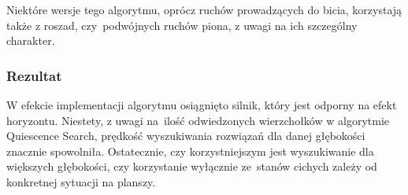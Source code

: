 Niektóre wersje tego algorytmu, oprócz ruchów prowadzących do bicia, korzystają także z roszad, czy~podwójnych ruchów piona, z uwagi na ich szczególny charakter.

\subsubsection{Rezultat}

W efekcie implementacji algorytmu osiągnięto silnik, który jest odporny na efekt horyzontu.
Niestety, z uwagi na~ilość odwiedzonych wierzchołków w algorytmie Quiescence Search, prędkość wyszukiwania rozwiązań dla danej głębokości znacznie spowolniła.
Ostatecznie, czy korzystniejszym jest wyszukiwanie dla większych głębokości, czy korzystanie wyłącznie ze~stanów cichych zależy od konkretnej sytuacji na planszy.